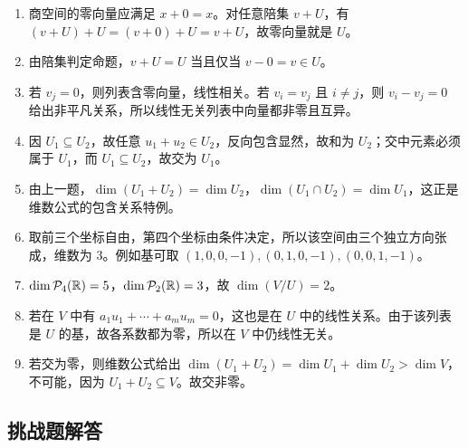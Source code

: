 \begin{enumerate}[label=\textbf{\medium\ \arabic*.}, leftmargin=3em]
\item 商空间的零向量应满足 $x+0=x$。对任意陪集 $v+U$，有 $(v+U)+U=(v+0)+U=v+U$，故零向量就是 $U$。
\item 由陪集判定命题，$v+U=U$ 当且仅当 $v-0=v\in U$。
\item 若 $v_j=0$，则列表含零向量，线性相关。若 $v_i=v_j$ 且 $i\neq j$，则 $v_i-v_j=0$ 给出非平凡关系，所以线性无关列表中向量都非零且互异。
\item 因 $U_1\subseteq U_2$，故任意 $u_1+u_2\in U_2$，反向包含显然，故和为 $U_2$；交中元素必须属于 $U_1$，而 $U_1\subseteq U_2$，故交为 $U_1$。
\item 由上一题，$\dim(U_1+U_2)=\dim U_2$，$\dim(U_1\cap U_2)=\dim U_1$，这正是维数公式的包含关系特例。
\item 取前三个坐标自由，第四个坐标由条件决定，所以该空间由三个独立方向张成，维数为 $3$。例如基可取 $(1,0,0,-1),(0,1,0,-1),(0,0,1,-1)$。
\item $\dim\mathcal{P}_4(\mathbb{R})=5$，$\dim\mathcal{P}_2(\mathbb{R})=3$，故 $\dim(V/U)=2$。
\item 若在 $V$ 中有 $a_1u_1+\cdots+a_mu_m=0$，这也是在 $U$ 中的线性关系。由于该列表是 $U$ 的基，故各系数都为零，所以在 $V$ 中仍线性无关。
\item 若交为零，则维数公式给出 $\dim(U_1+U_2)=\dim U_1+\dim U_2>\dim V$，不可能，因为 $U_1+U_2\subseteq V$。故交非零。
\end{enumerate}

\subsection*{挑战题解答}

